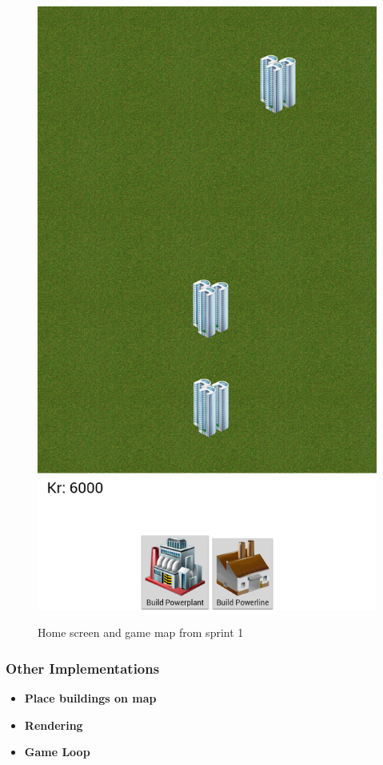 \begin{figure}[H]
{		\includegraphics[scale=0.2]{pictures/game_screenshot_1}
	}
	\caption{Home screen and game map from sprint 1}
	\end{figure}

	\subsubsection*{Other Implementations}
		\begin{itemize}
			\item {\bf Place buildings on map}
			\item {\bf Rendering}
			\item {\bf Game Loop}
		\end{itemize}

